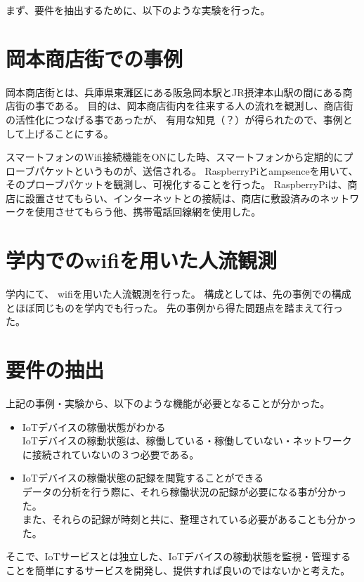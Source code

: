 まず、要件を抽出するために、以下のような実験を行った。

\section{岡本商店街での事例}
岡本商店街とは、兵庫県東灘区にある阪急岡本駅とJR摂津本山駅の間にある商店街の事である。
目的は、岡本商店街内を往来する人の流れを観測し、商店街の活性化につなげる事であったが、
有用な知見（？）が得られたので、事例として上げることにする。


スマートフォンのWifi接続機能をONにした時、スマートフォンから定期的にプローブパケットというものが、送信される。
RaspberryPiとampsenceを用いて、そのプローブパケットを観測し、可視化することを行った。
RaspberryPiは、商店に設置させてもらい、インターネットとの接続は、商店に敷設済みのネットワークを使用させてもらう他、携帯電話回線網を使用した。



\section{学内でのwifiを用いた人流観測}
学内にて、
wifiを用いた人流観測を行った。
構成としては、先の事例での構成とほぼ同じものを学内でも行った。
先の事例から得た問題点を踏まえて行った。




\section{要件の抽出}
上記の事例・実験から、以下のような機能が必要となることが分かった。

\begin{itemize}
\item IoTデバイスの稼働状態がわかる\\
	IoTデバイスの稼動状態は、稼働している・稼働していない・ネットワークに接続されていないの３つ必要である。
\item IoTデバイスの稼働状態の記録を閲覧することができる\\
	データの分析を行う際に、それら稼働状況の記録が必要になる事が分かった。\\
	また、それらの記録が時刻と共に、整理されている必要があることも分かった。
\end{itemize}

そこで、IoTサービスとは独立した、IoTデバイスの稼動状態を監視・管理することを簡単にするサービスを開発し、提供すれば良いのではないかと考えた。





